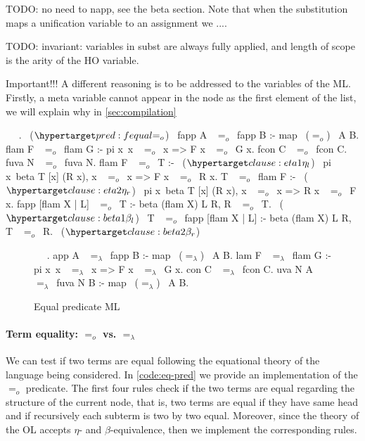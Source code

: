 \documentclass[sigconf,natbib=false,review]{acmart}
\newcommand{\EqualRel}{\ensuremath{=}}
\newcommand{\Eo}{\ensuremath{\EqualRel_o}\xspace}
\newcommand{\Ee}{\ensuremath{\EqualRel_\lambda}\xspace}
\begin{document}
\noindent
TODO: no need to napp, see the beta section.
Note that when the substitution  maps a unification variable
 to an assignment  we ....

TODO: invariant: variables in subst are always fully applied, and length of scope is the
arity of the HO variable. 

Important!!!
A different reasoning is to be addressed to the variables of the ML. Firstly, a
meta variable cannot appear in the  node as the first element of the
list, we will explain why in \cref{sec:compilation}

\begin{elpicode}
  ~ \PYG{n+nf}{(\Eo)} ~.                           ~($\customlabel{pred:fequal}{\Eo}$)~
  fapp A ~\Eo~fapp B :- map ~(\Eo)~ A B.
  flam F ~\Eo~flam G :- pi x\ x ~\Eo~x => F x ~\Eo~G x.
  fcon C ~\Eo~fcon C.
  fuva N ~\Eo~fuva N.
  flam F ~\Eo~T :-                                       ~($\customlabel{clause:eta1}{\eta_l}$)~
    pi x\ beta T [x] (R x), x ~\Eo~x => F x ~\Eo~R x.
  T ~\Eo~flam F :-                                       ~($\customlabel{clause:eta2}{\eta_r}$)~
    pi x\ beta T [x] (R x), x ~\Eo~x => R x ~\Eo~F x.
  fapp [flam X | L] ~\Eo~T :- beta (flam X) L R, R ~\Eo~T. ~($\customlabel{clause:beta1}{\beta_l}$)~
  T ~\Eo~fapp [flam X | L] :- beta (flam X) L R, T ~\Eo~R. ~($\customlabel{clause:beta2}{\beta_r}$)~
\end{elpicode}

\begin{figure}
  \begin{elpicode}
    ~ \PYG{n+nf}{(\Ee)} ~.
    app A ~\Ee~fapp B :- map ~(\Ee)~ A B.
    lam F ~\Ee~flam G :- pi x\ x ~\Ee~x => F x ~\Ee~G x.
    con C ~\Ee~fcon C.
    uva N A ~\Ee~fuva N B :- map ~(\Ee)~ A B.
  \end{elpicode}
  \caption{Equal predicate ML}
  \label{code:eq-pred-meta}
\end{figure}

\paragraph{Term equality: \Eo vs. \Ee} We can test if two terms are equal
following the equational theory of the language being considered. In
\cref{code:eq-pred} we provide an implementation of the \Eo predicate. The first
four rules check if the two terms are equal regarding the structure of the
current node, that is, two terms are equal if they have same head and if
recursively each subterm is two by two equal. Moreover, since the theory of the
OL accepts $\eta$- and $\beta$-equivalence, then we implement the corresponding
rules.
\end{document}
